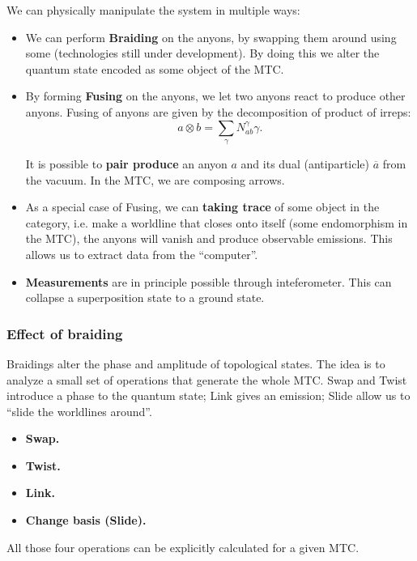 We can physically manipulate the system in multiple ways:
\begin{itemize}
	\item We can perform \textbf{Braiding} on the anyons, by swapping them around using some (technologies still under development). By doing this we alter the quantum state encoded as some object of the MTC.
	\item By forming \textbf{Fusing} on the anyons, we let two anyons react to produce other anyons.
	Fusing of anyons are given by the decomposition of product of irreps:
\[
	a \otimes b = \sum_{\gamma} N_{a b}^\gamma \gamma
.\] 

	It is possible to \textbf{pair produce} an anyon $a$ and its dual (antiparticle) $\overline{a} $ from the vacuum. In the MTC, we are composing arrows.

	\item As a special case of Fusing, we can \textbf{taking trace} of some object in the category, i.e. make a worldline that closes onto itself (some endomorphism in the MTC), the anyons will vanish and produce observable emissions. This allows us to extract data from the ``computer''.
	\item \textbf{Measurements} are in principle possible through inteferometer. This can collapse a superposition state to a ground state.
\end{itemize}

\subsubsection{Effect of braiding}

Braidings alter the phase and amplitude of topological states. The idea is to analyze a small set of operations that generate the whole MTC. Swap and Twist introduce a phase to the quantum state; Link gives an emission; Slide allow us to ``slide the worldlines around''. 

\begin{itemize}
	\item \textbf{Swap.} 
	\item \textbf{Twist.}
	\item \textbf{Link.}
	\item \textbf{Change basis (Slide).}
\end{itemize}
All those four operations can be explicitly calculated for a given MTC.

